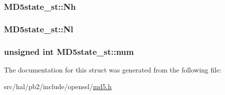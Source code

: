 \subsubsection[{\texorpdfstring{Nh}{Nh}}]{ M\+D5state\+\_\+st\+::\+Nh}\hypertarget{struct_m_d5state__st_a2eb6f766a15bf4987f75eda8f954e1f2}{}\label{struct_m_d5state__st_a2eb6f766a15bf4987f75eda8f954e1f2}
\subsubsection[{\texorpdfstring{Nl}{Nl}}]{ M\+D5state\+\_\+st\+::\+Nl}\hypertarget{struct_m_d5state__st_accb86d088daeafde5a370fb8a2961bd7}{}\label{struct_m_d5state__st_accb86d088daeafde5a370fb8a2961bd7}
\subsubsection[{\texorpdfstring{num}{num}}]{\setlength{\rightskip}{0pt plus 5cm}unsigned int M\+D5state\+\_\+st\+::num}\hypertarget{struct_m_d5state__st_ae35c099cfb7bdf972b4419998c7efc92}{}\label{struct_m_d5state__st_ae35c099cfb7bdf972b4419998c7efc92}


The documentation for this struct was generated from the following file\+:\begin{DoxyCompactItemize}
\item 
src/hal/pb2/include/openssl/\hyperlink{md5_8h}{md5.\+h}\end{DoxyCompactItemize}
